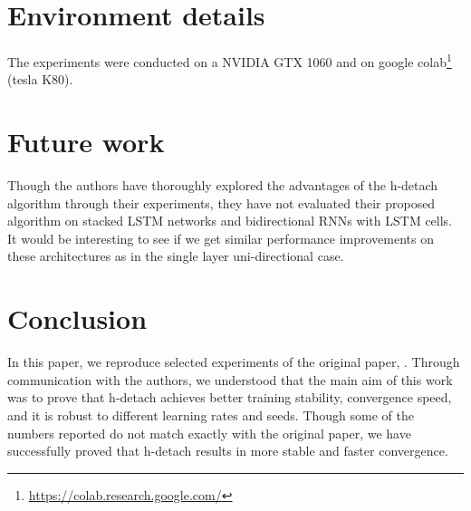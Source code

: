 \section{Environment details}

The experiments were conducted on a NVIDIA GTX 1060 and on google colab\footnote{\url{https://colab.research.google.com/}} (tesla K80).

\section{Future work}

Though the authors have thoroughly explored the advantages of the h-detach algorithm through their experiments, they have not evaluated their proposed algorithm on stacked LSTM networks and bidirectional RNNs with LSTM cells. It would be interesting to see if we get similar performance improvements on these architectures as in the single layer uni-directional case.


\section{Conclusion}
In this paper, we reproduce selected experiments of the original paper, \cite{kanuparthi2018hdetach}. Through communication with the authors, we understood that the main aim of this work was to prove that h-detach achieves better training stability, convergence speed, and it is robust to different learning rates and seeds. Though some of the numbers reported do not match exactly with the original paper, we have successfully proved that h-detach results in more stable and faster convergence. 

